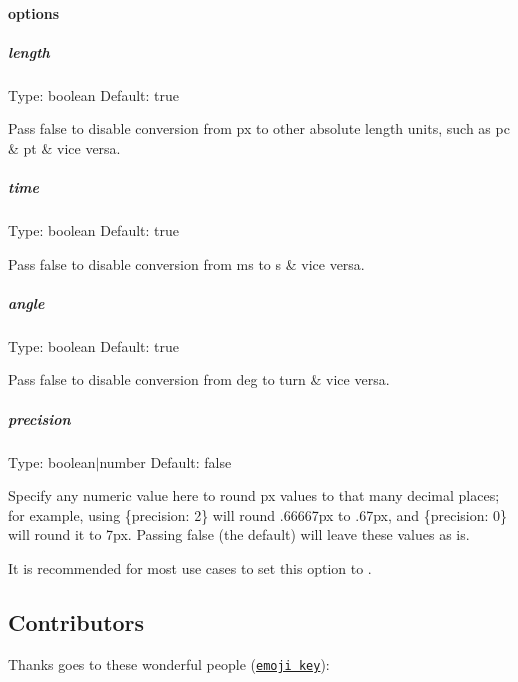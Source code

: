 \paragraph*{options}

\subparagraph*{length}

Type\+: {\ttfamily boolean} Default\+: {\ttfamily true}

Pass {\ttfamily false} to disable conversion from {\ttfamily px} to other absolute length units, such as {\ttfamily pc} \& {\ttfamily pt} \& vice versa.

\subparagraph*{time}

Type\+: {\ttfamily boolean} Default\+: {\ttfamily true}

Pass {\ttfamily false} to disable conversion from {\ttfamily ms} to {\ttfamily s} \& vice versa.

\subparagraph*{angle}

Type\+: {\ttfamily boolean} Default\+: {\ttfamily true}

Pass {\ttfamily false} to disable conversion from {\ttfamily deg} to {\ttfamily turn} \& vice versa.

\subparagraph*{precision}

Type\+: {\ttfamily boolean$\vert$number} Default\+: {\ttfamily false}

Specify any numeric value here to round {\ttfamily px} values to that many decimal places; for example, using {\ttfamily \{precision\+: 2\}} will round {.\+66667px} to {.\+67px}, and {\ttfamily \{precision\+: 0\}} will round it to {\ttfamily 7px}. Passing {\ttfamily false} (the default) will leave these values as is.

It is recommended for most use cases to set this option to {}.

\subsection*{Contributors}

Thanks goes to these wonderful people (\href{https://github.com/kentcdodds/all-contributors#emoji-key}{\tt emoji key})\+:

